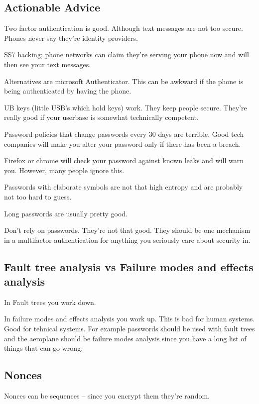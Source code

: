 \documentclass[10pt, a4paper]{article}
\begin{document}
\subsection{Actionable Advice}

Two factor authentication is good. Although text messages are not too secure. Phones
never say they're identity providers.

SS7 hacking; phone networks can claim they're serving your phone now and will then see your
text messages.

Alternatives are microsoft Authenticator. This can be awkward if the phone is being
authenticated by having the phone.

UB keys (little USB's which hold keys) work. They keep people secure. They're really good
if your userbase is somewhat technically competent.

Password policies that change passwords every 30 days are terrible. Good tech companies will
make you alter your password only if there has been a breach.

Firefox or chrome will check your password against known leaks and will warn you. However,
many people ignore this.

Passwords with elaborate symbols are not that high entropy and are probably not too hard to guess.

Long passwords are usually pretty good.

Don't rely on passwords. They're not that good. They should be one mechanism in a multifactor
authentication for anything you seriously care about security in.

\subsection{Fault tree analysis vs Failure modes and effects analysis}

In Fault trees you work down.

In failure modes and effects analysis you work up. This is bad for human systems. Good for tehnical systems. For
example passwords should be used with fault trees and the aeroplane should be failure modes analysis since you have a
long list of things that can go wrong.

\subsection{Nonces}

Nonces can be sequences -- since you encrypt them they're random.
\end{document}
